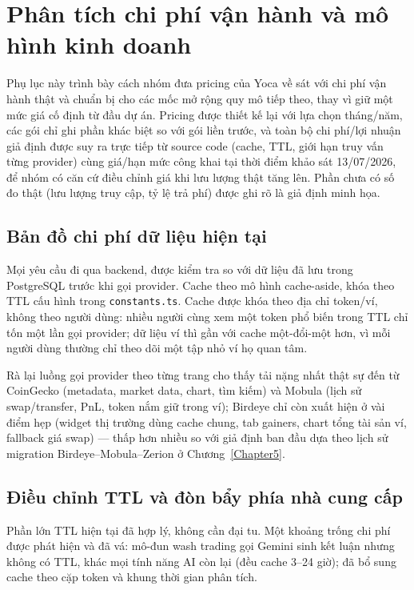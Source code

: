 \appendix

\chapter{Phân tích chi phí vận hành và mô hình kinh doanh}
\label{AppendixBusinessModel}

Phụ lục này trình bày cách nhóm đưa pricing của Yoca về sát với chi phí vận hành thật và chuẩn bị cho các mốc mở rộng quy mô tiếp theo, thay vì giữ một mức giá cố định từ đầu dự án. Pricing được thiết kế lại với lựa chọn tháng/năm, các gói chỉ ghi phần khác biệt so với gói liền trước, và toàn bộ chi phí/lợi nhuận giả định được suy ra trực tiếp từ source code (cache, TTL, giới hạn truy vấn từng provider) cùng giá/hạn mức công khai tại thời điểm khảo sát 13/07/2026, để nhóm có căn cứ điều chỉnh giá khi lưu lượng thật tăng lên. Phần chưa có số đo thật (lưu lượng truy cập, tỷ lệ trả phí) được ghi rõ là giả định minh họa.

\section{Bản đồ chi phí dữ liệu hiện tại}

Mọi yêu cầu đi qua backend, được kiểm tra so với dữ liệu đã lưu trong PostgreSQL trước khi gọi provider. Cache theo mô hình cache-aside, khóa theo TTL cấu hình trong \texttt{constants.ts}. Cache được khóa theo địa chỉ token/ví, không theo người dùng: nhiều người cùng xem một token phổ biến trong TTL chỉ tốn một lần gọi provider; dữ liệu ví thì gần với cache một-đổi-một hơn, vì mỗi người dùng thường chỉ theo dõi một tập nhỏ ví họ quan tâm.

Rà lại luồng gọi provider theo từng trang cho thấy tải nặng nhất thật sự đến từ CoinGecko (metadata, market data, chart, tìm kiếm) và Mobula (lịch sử swap/transfer, PnL, token nắm giữ trong ví); Birdeye chỉ còn xuất hiện ở vài điểm hẹp (widget thị trường dùng cache chung, tab gainers, chart tổng tài sản ví, fallback giá swap) — thấp hơn nhiều so với giả định ban đầu dựa theo lịch sử migration Birdeye--Mobula--Zerion ở Chương~\ref{Chapter5}.

\section{Điều chỉnh TTL và đòn bẩy phía nhà cung cấp}

Phần lớn TTL hiện tại đã hợp lý, không cần đại tu. Một khoảng trống chi phí được phát hiện và đã vá: mô-đun wash trading gọi Gemini sinh kết luận nhưng không có TTL, khác mọi tính năng AI còn lại (đều cache 3--24 giờ); đã bổ sung cache theo cặp token và khung thời gian phân tích.

